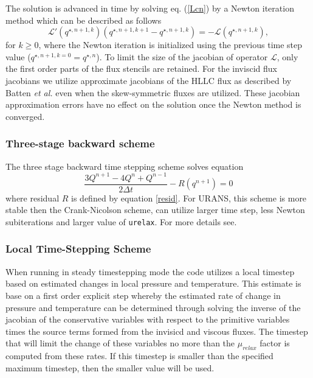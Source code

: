 The solution is advanced in time by solving eq. (\ref{Lcn}) by a
Newton iteration method which can be described as follows
\begin{equation}
\mathcal{L}'(q^{\star, n+1,k}) (q^{\star,n+1,k+1} - q^{\star, n+1,k}) = -\mathcal{L}
(q^{\star,n+1,k}), \label{new}
\end{equation}
for $k\geq 0$, where the Newton iteration is initialized using the
previous time step value ($q^{\star,n+1,k=0} = q^{\star,n}$). To limit
the size of the jacobian of operator $\mathcal{L}$, only the first
order parts of the flux stencils are retained.  For the inviscid flux
jacobians we utilize approximate jacobians of the HLLC flux as
described by Batten {\it et al.} \cite{Batten.2006} even when the
skew-symmetric fluxes are utilized. These jacobian approximation
errors have no effect on the solution once the Newton method is
converged.


\subsubsection{Three-stage backward scheme}
The three stage backward time stepping scheme solves equation
\begin{equation}
  \frac{3Q^{n+1}-4Q^{n}+Q^{n-1}}{2\Delta t}- R(q^{n+1}) = 0
\label{Thee_stage}
\end{equation}
where residual $R$ is defined by equation \ref{resid}. For URANS, this scheme is more stable
then the Crank-Nicolson scheme, can utilize larger time step, less
Newton subiterations and larger value of {\tt urelax}. For more details see\cite{Pulliam}.

\subsubsection{Local Time-Stepping Scheme}

When running in steady timestepping mode the code utilizes a local
timestep based on estimated changes in local pressure and temperature.
This estimate is base on a first order explicit step whereby the
estimated rate of change in pressure and temperature can be determined
through solving the inverse of the jacobian of the conservative
variables with respect to the primitive variables times the source
terms formed from the invisicd and viscous fluxes.  The timestep that
will limit the change of these variables no more than the
$\mu_{relax}$ factor is computed from these rates.  If this timestep
is smaller than the specified maximum timestep, then the smaller value
will be used.
